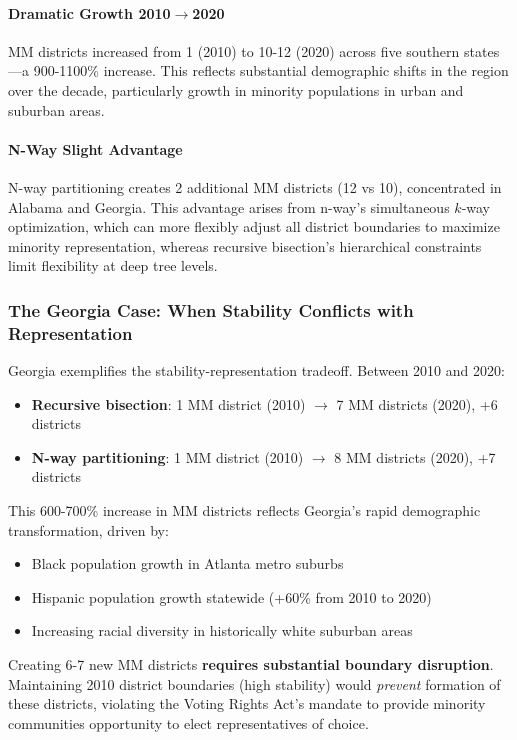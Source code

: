 \paragraph{Dramatic Growth 2010$\rightarrow$2020} MM districts increased from 1 (2010) to 10-12 (2020) across five southern states---a 900-1100\% increase. This reflects substantial demographic shifts in the region over the decade, particularly growth in minority populations in urban and suburban areas.

\paragraph{N-Way Slight Advantage} N-way partitioning creates 2 additional MM districts (12 vs 10), concentrated in Alabama and Georgia. This advantage arises from n-way's simultaneous $k$-way optimization, which can more flexibly adjust all district boundaries to maximize minority representation, whereas recursive bisection's hierarchical constraints limit flexibility at deep tree levels.

\subsubsection{The Georgia Case: When Stability Conflicts with Representation}

Georgia exemplifies the stability-representation tradeoff. Between 2010 and 2020:
\begin{itemize}
\item \textbf{Recursive bisection}: 1 MM district (2010) $\rightarrow$ 7 MM districts (2020), +6 districts
\item \textbf{N-way partitioning}: 1 MM district (2010) $\rightarrow$ 8 MM districts (2020), +7 districts
\end{itemize}

This 600-700\% increase in MM districts reflects Georgia's rapid demographic transformation, driven by:
\begin{itemize}
\item Black population growth in Atlanta metro suburbs
\item Hispanic population growth statewide (+60\% from 2010 to 2020)
\item Increasing racial diversity in historically white suburban areas
\end{itemize}

Creating 6-7 new MM districts \textbf{requires substantial boundary disruption}. Maintaining 2010 district boundaries (high stability) would \textit{prevent} formation of these districts, violating the Voting Rights Act's mandate to provide minority communities opportunity to elect representatives of choice.

